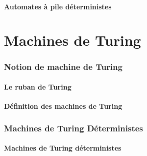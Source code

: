 \documentclass[9pt, handout]{beamer}
\begin{document}
\subsection{Automates à pile déterministes}



 
 
\part{Machines de Turing}
 
 
\section{Notion de machine de Turing}
 
\subsection{Le ruban de Turing}




 
\subsection{Définition des machines de Turing}




 
\section{Machines de Turing Déterministes}
 
\subsection{Machines de Turing déterministes}






 
\end{document}

